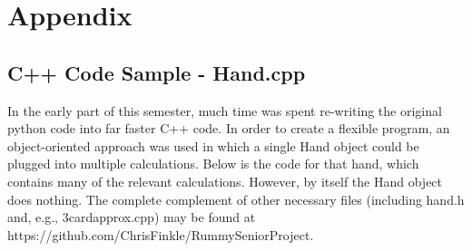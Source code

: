 \documentclass[letter,12pt]{article}
\begin{document}
\section{Appendix}

\subsection{C++ Code Sample - Hand.cpp}

In the early part of this semester, much time was spent re-writing the original python code into far faster C++ code. In order to create a flexible program, an object-oriented approach was used in which a single Hand object could be plugged into multiple calculations. Below is the code for that hand, which contains many of the relevant calculations. However, by itself the Hand object does nothing. The complete complement of other necessary files (including hand.h and, e.g., 3cardapprox.cpp) may be found at https://github.com/ChrisFinkle/RummySeniorProject.
\end{document}

